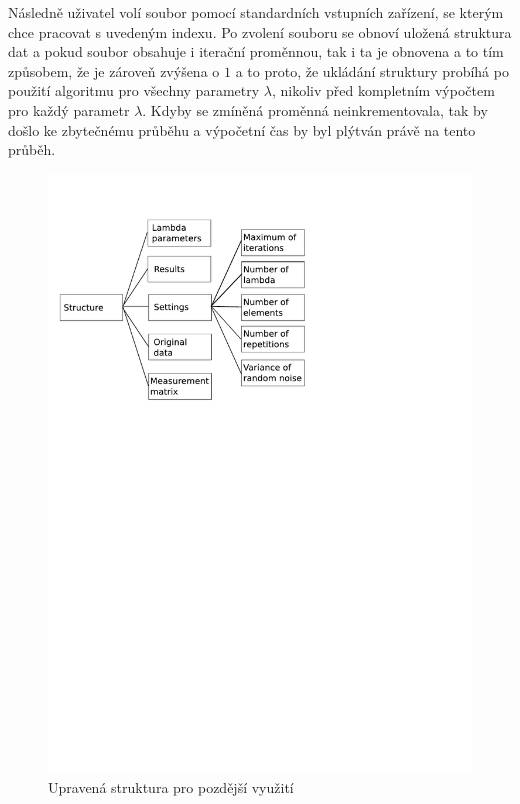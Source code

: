 \documentclass[FM,BP]{tulthesis}
\begin{document}
Následně uživatel volí soubor pomocí standardních vstupních zařízení, se kterým chce pracovat s uvedeným indexu. Po zvolení souboru se obnoví uložená struktura dat a pokud soubor obsahuje i iterační proměnnou, tak i ta je obnovena a to tím způsobem, že je zároveň zvýšena o $1$ a to proto, že ukládání struktury probíhá po použití algoritmu pro všechny parametry $\lambda$, nikoliv před kompletním výpočtem pro každý parametr $\lambda$. Kdyby se zmíněná proměnná neinkrementovala, tak by došlo ke zbytečnému průběhu a výpočetní čas by byl plýtván právě na tento průběh.

\begin{figure}[!ht]
	\begin{center}
		\includegraphics[scale=0.7]{obr/structure_new.pdf}
	\end{center}
	\caption{Upravená struktura pro pozdější využití}
	\label{fig:newstruct}
\end{figure}
\end{document}
